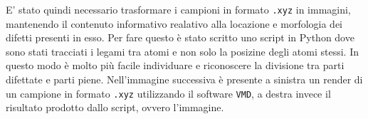 \documentclass[12pt,a4paper,openright,twoside]{report}
\begin{document}

E' stato quindi necessario trasformare i campioni in formato \texttt{.xyz} in immagini, mantenendo il contenuto informativo realativo alla locazione e morfologia dei difetti presenti in esso. 
Per fare questo è stato scritto uno script in Python dove sono stati tracciati i legami tra atomi e non solo la posizine degli atomi stessi. In questo modo è molto più facile individuare e riconoscere la divisione tra parti difettate e parti piene. 
Nell'immagine successiva è presente a sinistra un render di un campione in formato \texttt{.xyz} utilizzando il software \texttt{VMD}, a destra invece il risultato prodotto dallo script, ovvero l'immagine.
\end{document}
